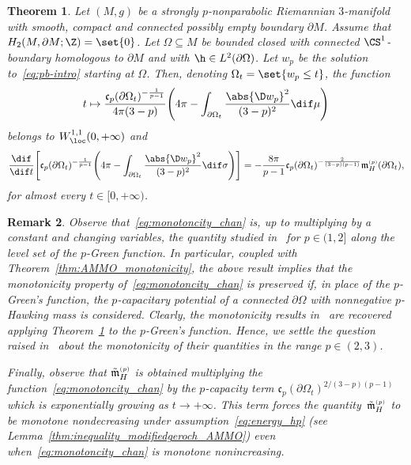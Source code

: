 \documentclass[10pt,a4paper]{amsart}
\numberwithin{equation}{section}
\newtheorem{Theorem}{Theorem}[section]
\newtheorem{Remark}[Theorem]{Remark} }
\renewcommand{\ncapa}{\mathfrak{c}}
\newcommand{\ma}{\mathfrak{m}}
\newcommand{\tp}[1][p]{{\text{\tiny$(#1)$}}}
\begin{document}
\begin{Theorem}\label{thm:CCLT_monotonicity}
 Let $(M,g)$ be a strongly $p$-nonparabolic Riemannian $3$-manifold with smooth, compact and connected possibly empty boundary $\partial M$. Assume that $H_2(M, \partial M;\Z) = \set{0}$. Let $\Omega\subseteq M$ be bounded closed with connected $\CS^1$-boundary homologous to $\partial M$ and with $\h\in L^2(\partial \Omega)$. Let $w_p$ be the solution to~\eqref{eq:pb-intro} starting at $\Omega$. Then, denoting $\Omega_t = \set{w_p \leq t}$, the function
 \begin{equation}\label{eq:monotoncity_chan}
 t \mapsto \frac{\ncapa_p(\partial \Omega_t)^{-\frac{1}{p-1}}}{4\pi(3-p)}\Bigg( 4 \pi - \int_{\partial \Omega_t} \frac{\abs{\D w_p}^2}{(3-p)^2}\dif \mu\Bigg)
 \end{equation}
 belongs to $W^{1,1}_{\loc}(0,+\infty)$ and
 \begin{equation}\label{eq:weak_derivative}
 \frac{\dif}{\dif t}\Bigg[\ncapa_p(\partial \Omega_t)^{-\frac{1}{p-1}}\Bigg( 4 \pi - \int_{\partial \Omega_t} \frac{\abs{\D w_p}^2}{(3-p)^2}\dif \sigma\Bigg)\Bigg] =- \frac{8\pi}{p-1}\ncapa_p(\partial \Omega_t)^{-\frac{2}{(3-p)(p-1)}}\ma_{H}^{\tp}(\partial \Omega_t),
 \end{equation}
 for almost every $t \in [0,+\infty)$.
\end{Theorem}

\begin{Remark}\label{rmk:cclt_mon}
 Observe that~\eqref{eq:monotoncity_chan} is, up to multiplying by a constant and changing variables, the quantity studied in~\cite{chan_monotonicitygreenfunctions_2022,munteanu_comparisontheorems3dmanifolds_2023} for $p\in(1,2]$ along the level set of the $p$-Green function. In particular, coupled with Theorem~\ref{thm:AMMO_monotonicity}, the above result implies that the monotonicity property of~\eqref{eq:monotoncity_chan} is preserved if, in place of the $p$-Green's function, the $p$-capacitary potential of a connected $\partial \Omega$ with nonnegative $p$-Hawking mass is considered. Clearly, the monotonicity results in~\cite{chan_monotonicitygreenfunctions_2022, munteanu_comparisontheorems3dmanifolds_2023} are recovered applying Theorem~\ref{thm:CCLT_monotonicity} to the $p$-Green's function. Hence, we settle the question raised in~\cite{chan_monotonicitygreenfunctions_2022} about the monotonicity of their quantities in the range $p \in (2, 3)$.

 Finally, observe that $\tilde{\ma}^{\tp}_H$ is obtained multiplying the function~\eqref{eq:monotoncity_chan} by the $p$-capacity term $\ncapa_p(\partial \Omega_t)^{2/(3-p)(p-1)}$ which is exponentially growing as $t \to +\infty$. This term forces the quantity~$\tilde{\ma}^{\tp}_H$ to be monotone \emph{nondecreasing} under assumption~\eqref{eq:energy_hp} (see Lemma~\ref{thm:inequality_modifiedgeroch_AMMO}) even when~\eqref{eq:monotoncity_chan} is monotone \emph{nonincreasing}.
\end{Remark}
\end{document}
